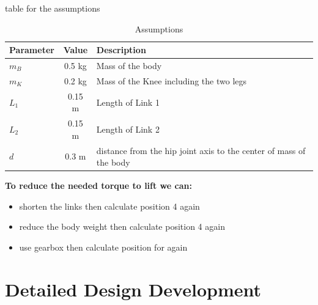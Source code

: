 table for the assumptions
\begin{table}[h]
	\centering
	\caption{Assumptions}
	\label{tab:assumptions}
	\begin{tabular}{lcl}
		\toprule
		Parameter & Value & Description 			  \\
		\midrule
		$m_B$         & 0.5 kg  & Mass of the body  \\
		$m_K$         & 0.2 kg  & Mass of the Knee including the two legs\\
		$L_1$         & 0.15 m   & Length of Link 1  \\
		$L_2$         & 0.15 m   & Length of Link 2   \\
		$d$ 	  	  & 0.3 m   & distance from the hip joint axis to the center of mass of the body   \\
		\bottomrule
	\end{tabular}
\end{table}

\begin{notebox}
	\textbf{To reduce the needed torque to lift we can:}
	\begin{itemize}
		\item shorten the links then calculate position 4 again
		\item reduce the body weight then calculate position 4 again
		\item use gearbox then calculate position for again
	\end{itemize}
\end{notebox}
\section{Detailed Design Development}


